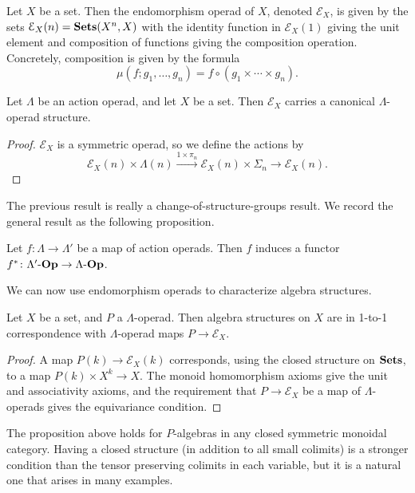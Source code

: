 Let $X$ be a set. Then the endomorphism operad of $X$, denoted $\mathcal{E}_{X}$, is given by the sets $\mathcal{E}_{X}(n) = \mathbf{Sets}(X^{n}, X)$ with the identity function in $\mathcal{E}_{X}(1)$ giving the unit element and composition of functions giving the composition operation. Concretely, composition is given by the formula
  \[
    \mu(f; g_{1}, \ldots, g_{n}) = f \circ (g_{1} \times \cdots \times g_{n}).
  \]

\begin{lem}
Let $\Lambda$ be an action operad, and let $X$ be a set. Then $\mathcal{E}_{X}$ carries a canonical $\Lambda$-operad structure.
\end{lem}
\begin{proof}
$\mathcal{E}_{X}$ is a symmetric operad, so we define the actions by
  \[
    \mathcal{E}_{X}(n) \times \Lambda(n) \stackrel{1 \times \pi_{n}}{\longrightarrow} \mathcal{E}_{X}(n) \times \Sigma_{n} \rightarrow \mathcal{E}_{X}(n).
  \]
\end{proof}

The previous result is really a change-of-structure-groups result. We record the general result as the following proposition.

\begin{prop}\label{pbaop}
Let $f \colon \Lambda \rightarrow \Lambda'$ be a map of action operads. Then $f$ induces a functor $f^{*} \colon \Lambda'\mbox{-}\mathbf{Op} \rightarrow \Lambda\mbox{-}\mathbf{Op}$.
\end{prop}

We can now use endomorphism operads to characterize algebra structures.

\begin{prop}\label{endoalg}
Let $X$ be a set, and $P$ a $\Lambda$-operad. Then algebra structures on $X$ are in 1-to-1 correspondence with $\Lambda$-operad maps $P \rightarrow \mathcal{E}_{X}$.
\end{prop}
\begin{proof}
A map $P(k) \rightarrow \mathcal{E}_{X}(k)$ corresponds, using the closed structure on $\mathbf{Sets}$, to a map $P(k) \times X^{k} \rightarrow X$. The monoid homomorphism axioms give the unit and associativity axioms, and the requirement that $P \rightarrow \mathcal{E}_{X}$ be a map of $\Lambda$-operads gives the equivariance condition.
\end{proof}

\begin{rem}
The proposition above holds for $P$-algebras in any closed symmetric monoidal category. Having a closed structure (in addition to all small colimits) is a stronger condition than the tensor preserving colimits in each variable, but it is a natural one that arises in many examples.
\end{rem}

